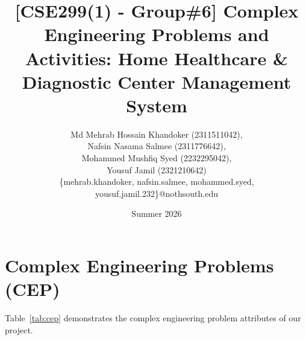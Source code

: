 \documentclass[lettersize,onecolumn,journal]{IEEEtran}
\begin{document}
\title{[CSE299(1) - Group\#6] Complex Engineering Problems and Activities: Home Healthcare \& Diagnostic Center Management System}
\date{Summer 2026}
\author{Md Mehrab Hossain Khandoker (2311511042),\\
Nafsin Nasama Salmee (2311776642),\\
Mohammed Mushfiq Syed (2232295042),\\
Yousuf Jamil (2321210642)\\
\{mehrab.khandoker, nafsin.salmee, mohammed.syed, yousuf.jamil.232\}@nothsouth.edu}
\maketitle

\section{Complex Engineering Problems (CEP)}

Table~\ref{tab:cep} demonstrates the complex engineering problem attributes of our project.
\end{document}
